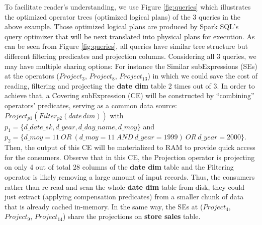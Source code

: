 To facilitate reader's understanding, we use Figure \ref{fig:queries} which illustrates the optimized operator trees (optimized logical plans) of the 3 queries in the above example. Those optimized logical plans are produced by Spark SQL's query optimizer that will be next translated into physical plans for execution. As can be seen from Figure \ref{fig:queries}, all queries have similar tree structure but different filtering predicates and projection columns. Considering all 3 queries, we may have multiple sharing options: For instance the Similar subExpressions (SEs) at the operators ($Project_3$, $Project_8$, $Project_{13}$) in which we could save the cost of reading, filtering and projecting the \textbf{date dim} table 2 times out of 3. In order to achieve that, a Covering subExpression (CE) will be constructed by ``combining'' operators' predicates, serving as a common data source: 
$Project_{p1}(Filter_{p2}(date\,dim))$ with $p_1 =\{d\_date\_sk, d\_year, d\_day\_name, d\_moy\}$ and 
$p_2 = \{d\_moy=11 \ OR\ (d\_moy=11 \ AND\ d\_year=1999) \ OR\ d\_year=2000\}$. Then, the output of this CE will be materialized to RAM to provide quick access for the consumers. Observe that in this CE, the Projection operator is projecting on only 4 out of total 28 columns of the \textbf{date dim} table and the Filtering operator is likely removing a large amount of input records. Thus, the consumers rather than re-read and scan the whole \textbf{date dim} table from disk, they could just extract (applying compensation predicates) from a smaller chunk of data that is already cached in-memory. In the same way, the SEs at ($Project_4$, $Project_9$, $Project_{14}$) share the projections on \textbf{store sales} table.

